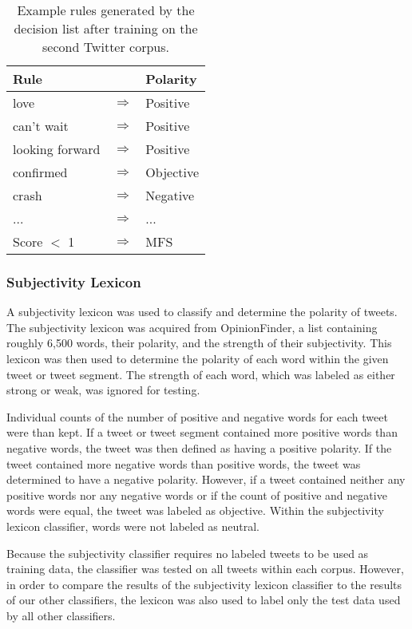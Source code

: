 \documentclass[11pt]{article}
\begin{document}
\begin{table}[H]
  \begin{center}
  \begin{tabular}{| p{3cm} l l |}
  \hline
  Rule & & Polarity \\ \hline
  love & $\Rightarrow$ & Positive \\
  can't wait & $\Rightarrow$ & Positive \\
  looking forward & $\Rightarrow$ & Positive \\
  confirmed & $\Rightarrow$ & Objective \\
  crash & $\Rightarrow$ & Negative \\
  ... & $\Rightarrow$ & ... \\
  Score $<$ 1 & $\Rightarrow$ & MFS \\ \hline
  \end{tabular}
  \end{center}
  \caption{Example rules generated by the decision list after training on the second Twitter corpus.}
\end{table}

\subsubsection*{Subjectivity Lexicon}
A subjectivity lexicon was used to classify and determine the polarity of tweets. The subjectivity lexicon was acquired from OpinionFinder, a list containing roughly 6,500 words, their polarity, and the strength of their subjectivity. This lexicon was then used to determine the polarity of each word within the given tweet or tweet segment. The strength of each word, which was labeled as either strong or weak, was ignored for testing.

\indent Individual counts of the number of positive and negative words for each tweet were than kept. If a tweet or tweet segment contained more positive words than negative words, the tweet was then defined as having a positive polarity. If the tweet contained more negative words than positive words, the tweet was determined to have a negative polarity. However, if a tweet contained neither any positive words nor any negative words or if the count of positive and negative words were equal, the tweet was labeled as objective. Within the subjectivity lexicon classifier, words were not labeled as neutral.

\indent Because the subjectivity classifier requires no labeled tweets to be used as training data, the classifier was tested on all tweets within each corpus. However, in order to compare the results of the subjectivity lexicon classifier to the results of our other classifiers, the lexicon was also used to label only the test data used by all other classifiers.
\end{document}
